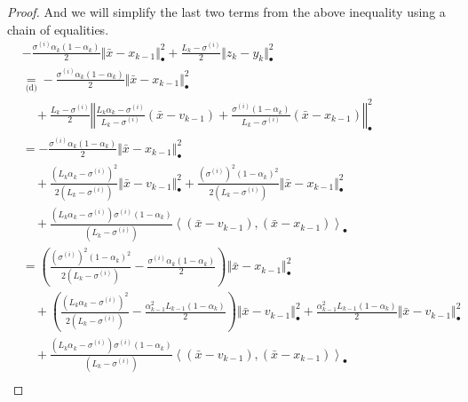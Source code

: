 \documentclass[12pt]{article}
\begin{document}
\begin{proof}
        And we will simplify the last two terms from the above inequality using a chain of equalities. 
        {\allowdisplaybreaks
        \begin{align*}
            & - \frac{\sigma^{(i)}\alpha_k(1 - \alpha_k)}{2}\Vert \bar x - x_{k - 1}\Vert^2_\bullet
            + \frac{L_k - \sigma^{(i)}}{2}\Vert z_k - y_k\Vert^2_\bullet
            \\
            &\underset{\text{(d)}}{=}
            - \frac{\sigma^{(i)}\alpha_k(1 - \alpha_k)}{2}\Vert \bar x - x_{k - 1}\Vert^2_\bullet
                \\&\quad
                + \frac{L_k - \sigma^{(i)}}{2}
                \left\Vert
                    \frac{L_k\alpha_k - \sigma^{(i)}}{L_k - \sigma^{(i)}}(\bar x - v_{k - 1})
                    + \frac{\sigma^{(i)}(1 - \alpha_k)}{L_k - \sigma^{(i)}}(\bar x - x_{k - 1})
                \right\Vert^2_\bullet
            \\
            &= 
            - \frac{\sigma^{(i)}\alpha_k(1 - \alpha_k)}{2}\Vert \bar x - x_{k - 1}\Vert^2_\bullet 
                \\&\quad
                + \frac{(L_k\alpha_k - \sigma^{(i)})^2}{2(L_k - \sigma^{(i)})} \Vert \bar x - v_{k - 1}\Vert^2_\bullet
                + \frac{(\sigma^{(i)})^2(1 - \alpha_k)^2}{2(L_k - \sigma^{(i)})}\Vert \bar x - x_{k - 1}\Vert^2_\bullet 
                \\&\quad 
                + \frac{(L_k\alpha_k  - \sigma^{(i)})\sigma^{(i)}(1 - \alpha_k)}{(L_k - \sigma^{(i)})}\left\langle (\bar x - v_{k - 1}),(\bar x - x_{k - 1})\right\rangle_\bullet
            \\
            &= 
            \left(
                \frac{(\sigma^{(i)})^2(1 - \alpha_k)^2}{2(L_k - \sigma^{(i)})} - \frac{\sigma^{(i)}\alpha_k(1 - \alpha_k)}{2}
            \right)\Vert \bar x - x_{k - 1}\Vert^2_\bullet
                \\ &\quad 
                + \left(
                    \frac{(L_k\alpha_k - \sigma^{(i)})^2}{2(L_k - \sigma^{(i)})} - \frac{\alpha_{k - 1}^2L_{k - 1}(1 - \alpha_k)}{2}
                \right) \Vert \bar x - v_{k - 1}\Vert^2_\bullet
                + \frac{\alpha_{k - 1}^2L_{k - 1}(1 - \alpha_k)}{2} \Vert \bar x - v_{k - 1}\Vert^2_\bullet
                \\&\quad 
                + \frac{(L_k\alpha_k  - \sigma^{(i)})\sigma^{(i)}(1 - \alpha_k)}{(L_k - \sigma^{(i)})}\left\langle (\bar x - v_{k - 1}),(\bar x - x_{k - 1})\right\rangle_\bullet
            \\

\end{align*}}
\end{proof}
\end{document}
